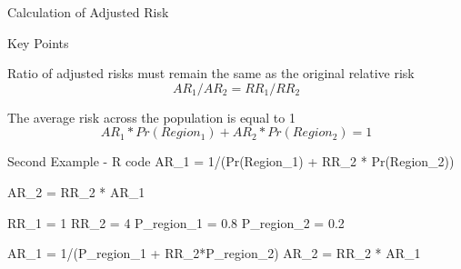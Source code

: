 \documentclass[
  ignorenonframetext,
]{beamer}
\newenvironment{Shaded}{\begin{snugshade}}{\end{snugshade}}
\newcommand{\DecValTok}[1]{\textcolor[rgb]{0.00,0.00,0.81}{#1}}
\newcommand{\FloatTok}[1]{\textcolor[rgb]{0.00,0.00,0.81}{#1}}
\newcommand{\NormalTok}[1]{#1}
\newcommand{\OtherTok}[1]{\textcolor[rgb]{0.56,0.35,0.01}{#1}}
\newcommand{\SpecialCharTok}[1]{\textcolor[rgb]{0.00,0.00,0.00}{#1}}
\begin{document}
\begin{frame}{Calculation of Adjusted Risk}
\protect\hypertarget{calculation-of-adjusted-risk}{}
\begin{block}{Key Points}
\protect\hypertarget{key-points}{}
\begin{block}{Ratio of adjusted risks must remain the same as the original relative risk}
  \begin{equation}
      AR_1/AR_2 = RR_1/RR_2
  \end{equation}
\end{block}

\begin{block}{The average risk across the population is equal to 1}
  \begin{equation}
      AR_1 * Pr(Region_1) + AR_2 * Pr(Region_2) = 1
  \end{equation}
\end{block}
\end{block}
\end{frame}

\begin{frame}[fragile]{Second Example - R code}
\protect\hypertarget{second-example---r-code}{}
AR\_1 = 1/(Pr(Region\_1) + RR\_2 * Pr(Region\_2))

AR\_2 = RR\_2 * AR\_1

\begin{Shaded}
\begin{Highlighting}[]
\NormalTok{RR\_1 }\OtherTok{=} \DecValTok{1}
\NormalTok{RR\_2 }\OtherTok{=} \DecValTok{4}
\NormalTok{P\_region\_1 }\OtherTok{=} \FloatTok{0.8}
\NormalTok{P\_region\_2 }\OtherTok{=} \FloatTok{0.2}
\end{Highlighting}
\end{Shaded}

\begin{Shaded}
\begin{Highlighting}[]
\NormalTok{AR\_1 }\OtherTok{=} \DecValTok{1}\SpecialCharTok{/}\NormalTok{(P\_region\_1 }\SpecialCharTok{+}\NormalTok{ RR\_2}\SpecialCharTok{*}\NormalTok{P\_region\_2)}
\NormalTok{AR\_2 }\OtherTok{=}\NormalTok{ RR\_2 }\SpecialCharTok{*}\NormalTok{ AR\_1}
\end{Highlighting}
\end{Shaded}
\end{frame}
\end{document}
